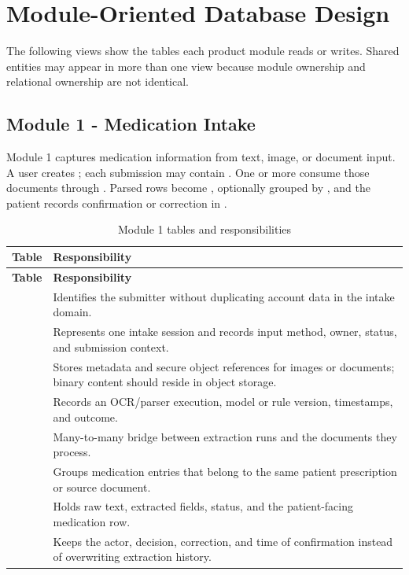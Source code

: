 \section{Module-Oriented Database Design}\label{sec:module-design}

The following views show the tables each product module reads or writes. Shared entities may appear in more than one view because module ownership and relational ownership are not identical.

\subsection{Module 1 - Medication Intake}

Module 1 captures medication information from text, image, or document input. A user creates ; each submission may contain . One or more  consume those documents through . Parsed rows become , optionally grouped by , and the patient records confirmation or correction in .


\begin{longtable}{L{4.5cm}L{10.8cm}}
\caption{Module 1 tables and responsibilities}\label{tab:module1-tables}\\
\toprule
\textbf{Table} & \textbf{Responsibility}\\
\midrule
\endfirsthead
\toprule
\textbf{Table} & \textbf{Responsibility}\\
\midrule
\endhead
{} & Identifies the submitter without duplicating account data in the intake domain.\\
 & Represents one intake session and records input method, owner, status, and submission context.\\
 & Stores metadata and secure object references for images or documents; binary content should reside in object storage.\\
 & Records an OCR/parser execution, model or rule version, timestamps, and outcome.\\
 & Many-to-many bridge between extraction runs and the documents they process.\\
 & Groups medication entries that belong to the same patient prescription or source document.\\
 & Holds raw text, extracted fields, status, and the patient-facing medication row.\\
 & Keeps the actor, decision, correction, and time of confirmation instead of overwriting extraction history.\\
\bottomrule
\end{longtable}

